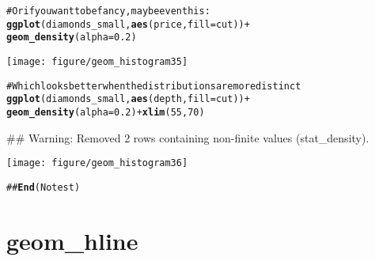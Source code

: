 \documentclass[a4paper,titlepage]{tufte-handout}\usepackage{graphicx, color}
\makeatletter
\def\maxwidth{ %
  \ifdim\Gin@nat@width>\linewidth
    \linewidth
  \else
    \Gin@nat@width
  \fi
}
\newcommand{\hlfunctioncall}[1]{\textcolor[rgb]{0.501960784313725,0,0.329411764705882}{\textbf{#1}}}%
\newcommand{\hlcomment}[1]{\textcolor[rgb]{0.180392156862745,0.6,0.341176470588235}{#1}}%
\newenvironment{kframe}{%
 \def\at@end@of@kframe{}%
 \ifinner\ifhmode%
  \def\at@end@of@kframe{\end{minipage}}%
  \begin{minipage}{\columnwidth}%
 \fi\fi%
 \def\FrameCommand##1{\hskip\@totalleftmargin \hskip-\fboxsep
 \colorbox{shadecolor}{##1}\hskip-\fboxsep
     \hskip-\linewidth \hskip-\@totalleftmargin \hskip\columnwidth}%
 \MakeFramed {\advance\hsize-\width
   \@totalleftmargin\z@ \linewidth\hsize
   \@setminipage}}%
 {\par\unskip\endMakeFramed%
 \at@end@of@kframe}
\newenvironment{knitrout}{}{} %
\makeatother
\begin{document}
\begin{knitrout}
\begin{kframe}
\begin{alltt}
\hlcomment{# Or if you want to be fancy, maybe even this:}
\hlfunctioncall{ggplot}(diamonds_small, \hlfunctioncall{aes}(price, fill = cut)) +
  \hlfunctioncall{geom_density}(alpha = 0.2)
\end{alltt}
\end{kframe}\texttt{[image: figure/geom\_histogram35]} \begin{kframe}\begin{alltt}
\hlcomment{# Which looks better when the distributions are more distinct}
\hlfunctioncall{ggplot}(diamonds_small, \hlfunctioncall{aes}(depth, fill = cut)) +
  \hlfunctioncall{geom_density}(alpha = 0.2) + \hlfunctioncall{xlim}(55, 70)
\end{alltt}
\begin{flushleft}\ttfamily\noindent\textcolor{warningcolor}{\#\# Warning: Removed 2 rows containing non-finite values (stat\_density).}\end{flushleft}\end{kframe}\texttt{[image: figure/geom\_histogram36]} \begin{kframe}\begin{alltt}
\hlcomment{## \hlfunctioncall{End}(No test)}
\end{alltt}
\end{kframe}
\end{knitrout}


\section{geom\_hline}
\end{document}
